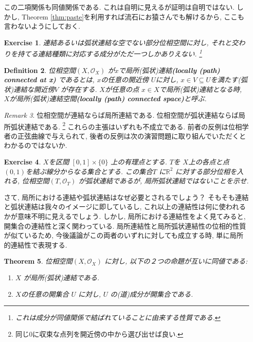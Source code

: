\documentclass[lualatex]{ltjsbook}
\newtheorem{theorem}{Theorem}[chapter]
\newtheorem{definition}[theorem]{Definition}
\theoremstyle{remark}
\newtheorem{remark}[theorem]{Remark}
\theoremstyle{plain}
\newtheorem{exercise}[theorem]{Exercise}
\begin{document}
この二項関係も同値関係である. これは自明に見えるが証明は自明ではない.
しかし,  Theorem \ref{thm:paste}を利用すれば流石にお猿さんでも解けるから,  ここも言わないようにしておく.

\begin{exercise}
	連結あるいは弧状連結な空でない部分位相空間に対し,  それと交わりを持てる連結種類に対応する成分がただ一つしかありえない. \footnote{これは成分が同値関係で結ばれていることに由来する性質である.}
\end{exercise}

\begin{definition}
	位相空間$\left( X ,  \mathcal{O}_{X} \right)$ が$x$で局所(弧状)連結\textbf{(locally (path) connected at x)}
	であるとは,  $x$の任意の開近傍 $U$に対し,  $x \in V \subseteq U$を満たす(弧状)連結な開近傍$V$ が存在する. 
	$X$が任意の点 $x \in X$で局所(弧状)連結となる時,   $X$が局所(弧状)連結空間\textbf{(locally (path) connected space)}と呼ぶ.
\end{definition}

\begin{remark}
	位相空間が連結ならば局所連結である. 位相空間が弧状連結ならば局所弧状連結である. \footnote{同じ$0$に収束な点列を開近傍の中から選び出せば良い.}
	これらの主張はいずれも不成立である. 前者の反例は位相学者の正弦曲線で与えられて,  後者の反例は次の演習問題に取り組んでいただくとわかるのではないか. 
\end{remark}

\begin{exercise}
	$X$を区間 $[0, 1] \times \{0\} $ 上の有理点とする. 
	$T$を $X$上の各点と点$(0, 1)$を結ぶ線分からなる集合とする.
	この集合$T$ に$\mathbb{R}^2$ に対する部分位相を入れる,  位相空間$\left( T ,  \mathcal{O}_{T} \right)$
	が弧状連結であるが,  局所弧状連結ではないことを示せ. 
\end{exercise}

さて,  局所における連結や弧状連結はなぜ必要とされるでしょう？
そもそも連結と弧状連結は我々のイメージに即しているし, 
これ以上の連結性は何に使われるかが意味不明に見えるでしょう.
しかし,  局所における連結性をよく見てみると,  開集合の連結性と深く関わっている. 
局所連結性と局所弧状連結性の位相的性質が似ているため,  今後議論がこの両者のいずれに対しても成立する時, 
単に局所的連結性で表現する.

\begin{theorem}
	位相空間$\left( X ,  \mathcal{O}_{X} \right)$ に対し,  以下の２つの命題が互いに同値である: 
	\begin{enumerate}
		\item $X$ が局所(弧状)連結である.
		\item $X$の任意の開集合 $U$ に対し,  $U$ の(道)成分が開集合である.
	\end{enumerate}
\end{theorem}
\end{document}
